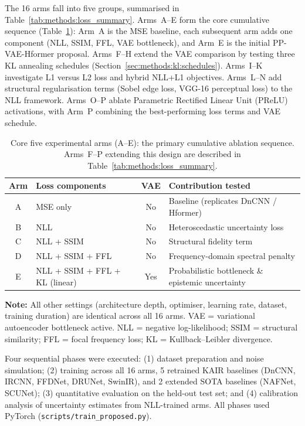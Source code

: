 \documentclass[12pt, a4paper, twoside, openright]{book}
\begin{document}
The 16 arms fall into five groups, summarised in Table~\ref{tab:methods:loss_summary}. Arms~A--E form the core cumulative sequence (Table~\ref{tab:methods:arms}): Arm~A is the MSE baseline, each subsequent arm adds one component (NLL, SSIM, FFL, VAE bottleneck), and Arm~E is the initial PP-VAE-Hformer proposal. Arms~F--H extend the VAE comparison by testing three KL annealing schedules (Section~\ref{sec:methods:kl:schedules}). Arms~I--K investigate L1 versus L2 loss and hybrid NLL+L1 objectives. Arms~L--N add structural regularisation terms (Sobel edge loss, VGG-16 perceptual loss) to the NLL framework. Arms~O--P ablate Parametric Rectified Linear Unit (PReLU) activations, with Arm~P combining the best-performing loss terms and VAE schedule.
\begin{table}[htbp]
  \centering
  \caption{Core five experimental arms (A--E): the primary cumulative ablation sequence. Arms~F--P extending this design are described in Table~\ref{tab:methods:loss_summary}.}
  \label{tab:methods:arms}
  \small
  \begin{tabular}{c p{3.8cm} c p{4.5cm}}
    \toprule
    \textbf{Arm} & \textbf{Loss components} & \textbf{VAE} & \textbf{Contribution tested} \\
    \midrule
    A & MSE only                                 & No  & Baseline (replicates DnCNN / Hformer) \\
    B & NLL                                      & No  & Heteroscedastic uncertainty loss \\
    C & NLL + SSIM                               & No  & Structural fidelity term \\
    D & NLL + SSIM + FFL                         & No  & Frequency-domain spectral penalty \\
    E & NLL + SSIM + FFL + KL (linear)           & Yes & Probabilistic bottleneck \& epistemic uncertainty \\
    \bottomrule
  \end{tabular}

  \vspace{0.3em}
  {\footnotesize \textbf{Note:} All other settings (architecture depth, optimiser, learning rate,
  dataset, training duration) are identical across all 16 arms. VAE = variational autoencoder bottleneck active.
  NLL = negative log-likelihood; SSIM = structural similarity; FFL = focal frequency loss;
  KL = Kullback--Leibler divergence.}
\end{table}
Four sequential phases were executed: (1) dataset preparation and noise simulation; (2) training across all 16 arms, 5 retrained KAIR baselines (DnCNN, IRCNN, FFDNet, DRUNet, SwinIR), and 2 extended SOTA baselines (NAFNet, SCUNet); (3) quantitative evaluation on the held-out test set; and (4) calibration analysis of uncertainty estimates from NLL-trained arms. All phases used PyTorch \cite{paszke_pytorch_2019} (\texttt{scripts/train\_proposed.py}).
\end{document}
